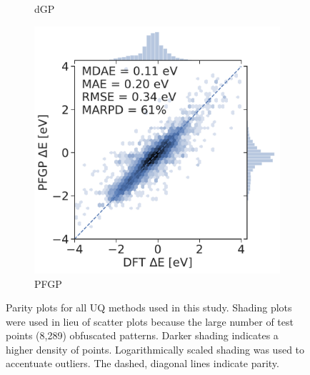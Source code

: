 \documentclass[]{achemso}
\begin{document}
\begin{figure}
\begin{subfigure}{0.32\textwidth}
        \caption{\gls{dGP}}\label{fig:parity_dgp}
    \end{subfigure}
    \begin{subfigure}{0.32\textwidth}
        \includegraphics[width=\textwidth]{../PFGP/Matern/parity.pdf}
        \caption{\gls{PFGP}}\label{fig:parity_pfgp}
    \end{subfigure}
    \caption{Parity plots for all \gls{UQ} methods used in this study.
    Shading plots were used in lieu of scatter plots because the large number of test points (8,289) obfuscated patterns.
    Darker shading indicates a higher density of points.
    Logarithmically scaled shading was used to accentuate outliers.
    The dashed, diagonal lines indicate parity.}\label{fig:parity}
\end{figure}
\end{document}
